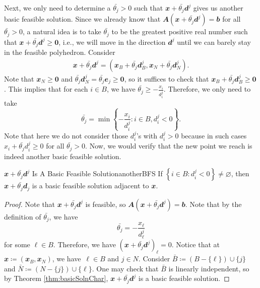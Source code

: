 \documentclass[math, code]{amznotes}
\theoremstyle{remark}
\begin{document}
Next, we only need to determine a $\bar{\theta_j} > 0$ such that $\mathbfit{x} + \bar{\theta_j}\mathbfit{d}^j$ gives us another basic feasible solution. Since we already know that $\mathbfit{A}\left(\mathbfit{x} + \bar{\theta_j}\mathbfit{d}^j\right) = \mathbfit{b}$ for all $\bar{\theta_j} > 0$, a natural idea is to take $\bar{\theta_j}$ to be the greatest positive real number such that $\mathbfit{x} + \bar{\theta_j}\mathbfit{d}^j \geq \mathbf{0}$, i.e., we will move in the direction $\mathbfit{d}^j$ until we can barely stay in the feasible polyhedron. Consider
\begin{align*}
    \mathbfit{x} + \bar{\theta_j}\mathbfit{d}^j = \left(\mathbfit{x}_B + \bar{\theta_j}\mathbfit{d}^j_B, \mathbfit{x}_N + \bar{\theta_j}\mathbfit{d}^j_N\right).
\end{align*}
Note that $\mathbfit{x}_N \geq \mathbf{0}$ and $\bar{\theta_j}\mathbfit{d}^j_N = \bar{\theta_j}\mathbfit{e}_j \geq \mathbf{0}$, so it suffices to check that $\mathbfit{x}_B + \bar{\theta_j}\mathbfit{d}^j_B \geq \mathbf{0}$. This implies that for each $i \in B$, we have $\bar{\theta_j} \geq -\frac{x_i}{d^j_i}$. Therefore, we only need to take
\begin{equation*}
    \bar{\theta_j} = \min\left\{-\frac{x_i}{d^j_i} \colon i \in B, d^j_i < 0\right\}.
\end{equation*}
Note that here we do not consider those $d^j_i$'s with $d^j_i > 0$ because in such cases $x_i + \bar{\theta_j}d^j_i \geq 0$ for all $\bar{\theta_j} > 0$. Now, we would verify that the new point we reach is indeed another basic feasible solution.
\begin{probox}{$\mathbfit{x} + \bar{\theta_j}\mathbfit{d}^j$ Is A Basic Feasible Solution}{anotherBFS}
    If $\left\{i \in B \colon d_i^j < 0\right\} \neq \varnothing$, then $\mathbfit{x} + \bar{\theta_j}\mathbfit{d}_j$ is a basic feasible solution adjacent to $\mathbfit{x}$.
    \tcblower
    \begin{proof}
        Note that $\mathbfit{x} + \bar{\theta_j}\mathbfit{d}^j$ is feasible, so $\mathbfit{A}\left(\mathbfit{x} + \bar{\theta_j}\mathbfit{d}^j\right) = \mathbfit{b}$. Note that by the definition of $\bar{\theta_j}$, we have 
        \begin{equation*}
            \bar{\theta_j} = -\frac{x_{\ell}}{d_{\ell}^j}
        \end{equation*}
        for some $\ell \in B$. Therefore, we have $\left(\mathbfit{x} + \bar{\theta_j}\mathbfit{d}^j\right)_{\ell} = 0$. Notice that at $\mathbfit{x} \coloneqq \left(\mathbfit{x}_B, \mathbfit{x}_N\right)$, we have~$\ell \in B$ and $j \in N$. Consider $\bar{B} \coloneqq (B - \{\ell\}) \cup \{j\}$ and $\bar{N} \coloneqq (N - \{j\}) \cup \{\ell\}$. One may check that $\bar{B}$ is linearly independent, so by Theorem \ref{thm:basicSolnChar}, $\mathbfit{x} + \bar{\theta_j}\mathbfit{d}^j$ is a basic feasible solution.
    \end{proof}
\end{probox}
\end{document}
